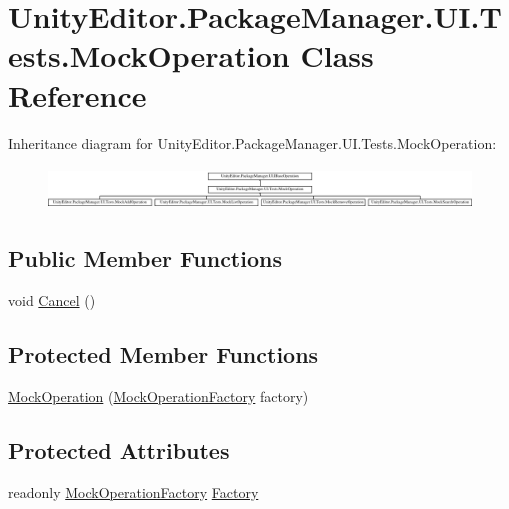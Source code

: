 \hypertarget{class_unity_editor_1_1_package_manager_1_1_u_i_1_1_tests_1_1_mock_operation}{}\section{Unity\+Editor.\+Package\+Manager.\+U\+I.\+Tests.\+Mock\+Operation Class Reference}
\label{class_unity_editor_1_1_package_manager_1_1_u_i_1_1_tests_1_1_mock_operation}
Inheritance diagram for Unity\+Editor.\+Package\+Manager.\+U\+I.\+Tests.\+Mock\+Operation\+:\begin{figure}[H]
\begin{center}
\leavevmode
\includegraphics[height=1.138211cm]{class_unity_editor_1_1_package_manager_1_1_u_i_1_1_tests_1_1_mock_operation}
\end{center}
\end{figure}
\subsection*{Public Member Functions}
\begin{DoxyCompactItemize}
\item 
void \mbox{\hyperlink{class_unity_editor_1_1_package_manager_1_1_u_i_1_1_tests_1_1_mock_operation_a8d5c37459e639081a1812925336e2756}{Cancel}} ()
\end{DoxyCompactItemize}
\subsection*{Protected Member Functions}
\begin{DoxyCompactItemize}
\item 
\mbox{\hyperlink{class_unity_editor_1_1_package_manager_1_1_u_i_1_1_tests_1_1_mock_operation_a9cabeb25fa9d36f75e59012f142583dd}{Mock\+Operation}} (\mbox{\hyperlink{class_unity_editor_1_1_package_manager_1_1_u_i_1_1_tests_1_1_mock_operation_factory}{Mock\+Operation\+Factory}} factory)
\end{DoxyCompactItemize}
\subsection*{Protected Attributes}
\begin{DoxyCompactItemize}
\item 
readonly \mbox{\hyperlink{class_unity_editor_1_1_package_manager_1_1_u_i_1_1_tests_1_1_mock_operation_factory}{Mock\+Operation\+Factory}} \mbox{\hyperlink{class_unity_editor_1_1_package_manager_1_1_u_i_1_1_tests_1_1_mock_operation_a2fda81e2896b7efe70101dad2565bd9c}{Factory}}
\end{DoxyCompactItemize}
